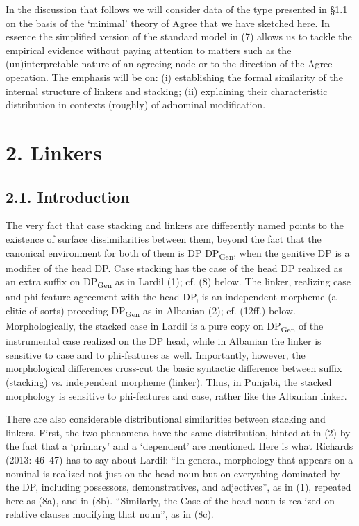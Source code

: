\documentclass[output=paper]{langsci/langscibook}
\begin{document}
  In the discussion that follows we will consider data of the type presented in §1.1 on the basis of the ‘minimal’ theory of Agree that we have sketched here. In essence the simplified version of the standard model in (7) allows us to tackle the empirical evidence without paying attention to matters such as the (un)interpretable nature of an agreeing node or to the direction of the Agree operation. The emphasis will be on: (i) establishing the formal similarity of the internal structure of linkers and stacking; (ii) explaining their characteristic distribution in contexts (roughly) of adnominal modification.   

\section{ 2. Linkers} 

\subsection{ 2.1. Introduction}

\begin{styleSfondomedioiColorexxi}
The very fact that case stacking and linkers are differently named points to the existence of surface dissimilarities between them, beyond the fact that the canonical environment for both of them is DP DP\textsubscript{Gen}, when the genitive DP is a modifier of the head DP. Case stacking has the case of the head DP realized as an extra suffix on DP\textsubscript{Gen} as in Lardil (1); cf. (8) below. The linker, realizing case and phi-feature agreement with the head DP, is an independent morpheme (a clitic of sorts) preceding DP\textsubscript{Gen} as in Albanian (2); cf. (12ff.) below. Morphologically, the stacked case in Lardil is a pure copy on DP\textsubscript{Gen} of the instrumental case realized on the DP head, while in Albanian the linker is sensitive to case and to phi-features as well. Importantly, however, the morphological differences cross-cut the basic syntactic difference between suffix (stacking) vs. independent morpheme (linker). Thus, in Punjabi, the stacked morphology is sensitive to phi-features and case, rather like the Albanian linker.  
\end{styleSfondomedioiColorexxi}

\begin{styleSfondomedioiColorexxi}
  There are also considerable distributional similarities between stacking and linkers. First, the two phenomena have the same distribution, hinted at in (2) by the fact that a ‘primary’ and a ‘dependent’ are mentioned. Here is what Richards (2013: 46–47) has to say about Lardil: “In general, morphology that appears on a nominal is realized not just on the head noun but on everything dominated by the DP, including possessors, demonstratives, and adjectives”, as in (1), repeated here as (8a), and in (8b). “Similarly, the Case of the head noun is realized on relative clauses modifying that noun”, as in (8c).  
\end{styleSfondomedioiColorexxi}
\end{document}
